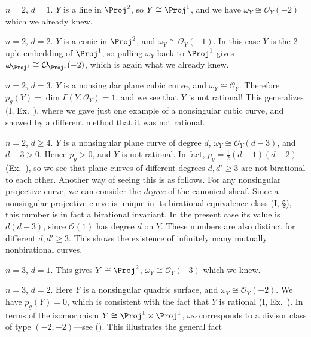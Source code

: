 {$n=2$, $d=1$. $Y$ is a line in $\Proj^2$, so $Y\cong\Proj^1$, and we have $\omega_Y\cong\mathcal O_Y(-2)$ which we already knew.

$n=2$, $d=2$. $Y$ is a conic in $\Proj^2$, and $\omega_Y\cong\mathcal O_Y(-1)$. In this case $Y$ is the 2-uple embedding of $\Proj^1$, so pulling $\omega_Y$ back to $\Proj^1$ gives $\omega_{\Proj^1}\cong\mathcal O_{\Proj^1}(-2)$, which is again what we already knew.

$n=2$, $d=3$. $Y$ is a nonsingular plane cubic curve, and $\omega_Y\cong\mathcal O_Y$. Therefore $p_g(Y)=\dim\Gamma(Y,\mathcal O_Y)=1$, and we see that $Y$ is not rational! This generalizes (I, Ex.~), where we gave just one example of a nonsingular cubic curve, and showed by a different method that it was not rational.

$n=2$, $d\ge4$. $Y$ is a nonsingular plane curve of degree $d$, $\omega_Y\cong\mathcal O_Y(d-3)$, and $d-3>0$. Hence $p_g>0$, and $Y$ is not rational. In fact, $p_g=\frac12(d-1)(d-2)$ (Ex.~), so we see that plane curves of different degrees $d,d'\ge3$ are not birational to each other. Another way of seeing this is as follows. For any nonsingular projective curve, we can consider the \emph{degree} of the canonical sheaf. Since a nonsingular projective curve is unique in its birational equivalence class (I, \S{}), this number is in fact a birational invariant. In the present case its value is $d(d-3)$, since $\mathcal O(1)$ has degree $d$ on $Y$. These numbers are also distinct for different $d,d'\ge3$. This shows the existence of infinitely many mutually nonbirational curves.

$n=3$, $d=1$. This gives $Y\cong\Proj^2$, $\omega_Y\cong\mathcal O_Y(-3)$ which we knew.

$n=3$, $d=2$. Here $Y$ is a nonsingular quadric surface, and $\omega_Y\cong\mathcal O_Y(-2)$. We have $p_g(Y)=0$, which is consistent with the fact that $Y$ is rational (I, Ex.~). In terms of the isomorphism $Y\cong\Proj^1\times\Proj^1$, $\omega_Y$ corresponds to a divisor class of type $(-2,-2)$---see (). This illustrates the general fact
}
